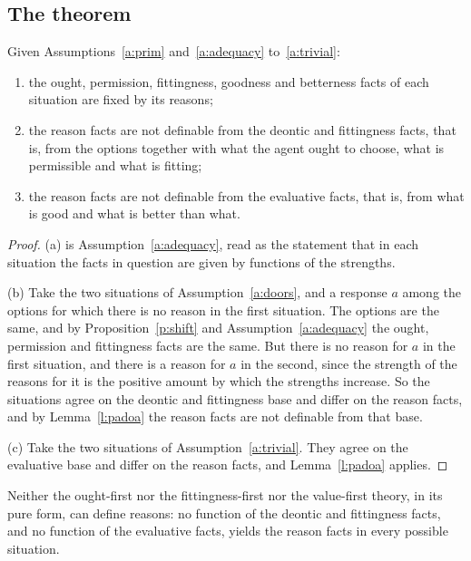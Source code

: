 \documentclass{situationist-preprint}
\begin{document}
\subsection{The theorem}

\begin{theorem}\label{t:main}
Given Assumptions~\ref{a:prim} and~\ref{a:adequacy} to~\ref{a:trivial}:
\begin{enumerate}[label=(\alph*)]
\item the ought, permission, fittingness, goodness and betterness facts of each situation are fixed by its reasons;
\item the reason facts are not definable from the deontic and fittingness facts, that is, from the options together with what the agent ought to choose, what is permissible and what is fitting;
\item the reason facts are not definable from the evaluative facts, that is, from what is good and what is better than what.
\end{enumerate}
\end{theorem}

\begin{proof}
(a) is Assumption~\ref{a:adequacy}, read as the statement that in each situation the facts in question are given by functions of the strengths.

(b) Take the two situations of Assumption~\ref{a:doors}, and a response $a$ among the options for which there is no reason in the first situation. The options are the same, and by Proposition~\ref{p:shift} and Assumption~\ref{a:adequacy} the ought, permission and fittingness facts are the same. But there is no reason for $a$ in the first situation, and there is a reason for $a$ in the second, since the strength of the reasons for it is the positive amount by which the strengths increase. So the situations agree on the deontic and fittingness base and differ on the reason facts, and by Lemma~\ref{l:padoa} the reason facts are not definable from that base.

(c) Take the two situations of Assumption~\ref{a:trivial}. They agree on the evaluative base and differ on the reason facts, and Lemma~\ref{l:padoa} applies.
\end{proof}

\begin{corollary}\label{c:rivals}
Neither the ought-first nor the fittingness-first nor the value-first theory, in its pure form, can define reasons: no function of the deontic and fittingness facts, and no function of the evaluative facts, yields the reason facts in every possible situation.
\end{corollary}
\end{document}
